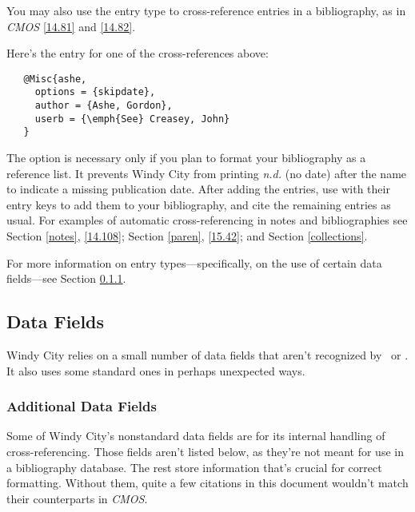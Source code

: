 \documentclass[11pt,letterpaper,oneside]{article}
\begin{document}
You may also use the  entry type to cross-reference
entries in a bibliography, as in \textit{CMOS} \ref{14.81} and
\ref{14.82}.

\begin{bibonly}
\nocite{ashe,creasey1976,creasey1978,creasey1966,morton,york}
\end{bibonly}

\noindent Here's the  entry for one of the
cross-references above:

\begin{verbatim}
   @Misc{ashe,
     options = {skipdate},
     author = {Ashe, Gordon},
     userb = {\emph{See} Creasey, John}
   }
\end{verbatim}

\noindent The option  is necessary only if you plan to
format your bibliography as a reference list. It prevents Windy City
from printing \textit{n.d.} (no date) after the name to indicate a
missing publication date. After adding the  entries, use
 with their entry keys to add them to your bibliography,
and cite the remaining entries as usual. For examples of automatic
cross-referencing in notes and bibliographies see Section \ref{notes},
\ref{14.108}; Section \ref{paren}, \ref{15.42}; and Section
\ref{collections}.

For more information on entry types---specifically, on the use of
certain data fields---see Section \ref{datafields}.

\subsection{Data Fields}
\label{datafields}

Windy City relies on a small number of data fields that aren't
recognized by \BibTeX\ or \biblatex. It also uses some standard ones
in perhaps unexpected ways.

\subsubsection{Additional Data Fields}
\label{datafields}

Some of Windy City's nonstandard data fields are for its internal
handling of cross-referencing. Those fields aren't listed below, as
they're not meant for use in a bibliography database. The rest store
information that's crucial for correct formatting. Without them, quite
a few citations in this document wouldn't match their counterparts in
\textit{CMOS}.
\end{document}

